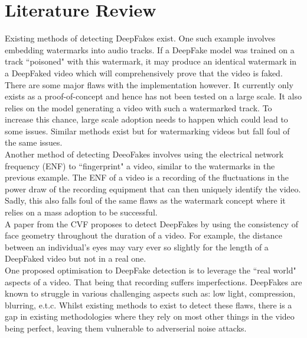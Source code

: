 \section{Literature Review}

Existing methods of detecting DeepFakes exist. One such example involves embedding watermarks into audio tracks. If a DeepFake model was trained on a track ``poisoned" with this watermark, it may produce an identical watermark in a DeepFaked video which will comprehensively prove that the video is faked\cite{watermark}. There are some major flaws with the implementation however. It currently only exists as a proof-of-concept and hence has not been tested on a large scale. It also relies on the model generating a video with such a watermarked track. To increase this chance, large scale adoption needs to happen which could lead to some issues. Similar methods exist but for watermarking videos but fall foul of the same issues\cite{watermarkvideo}.\\

Another method of detecting DeeoFakes involves using the electrical network frequency (ENF) to ``fingerprint" a video\cite{powerdraw}, similar to the watermarks in the previous example. The ENF of a video is a recording of the fluctuations in the power draw of the recording equipment that can then uniquely identify the video. Sadly, this also falls foul of the same flaws as the watermark concept where it relies on a mass adoption to be successful.\\

A paper from the CVF proposes to detect DeepFakes by using the consistency of face geometry throughout the duration of a video\cite{geometry}. For example, the distance between an individual's eyes may vary ever so slightly for the length of a DeepFaked video but not in a real one.\\

One proposed optimisation to DeepFake detection is to leverage the ``real world" aspects of a video. That being that recording suffers imperfections. DeepFakes are known to struggle in various challenging aspects such as: low light, compression, blurring, e.t.c\cite{horizon}. Whilst existing methods to exist to detect these flaws, there is a gap in existing methodologies where they rely on most other things in the video being perfect, leaving them vulnerable to adverserial noise attacks.

